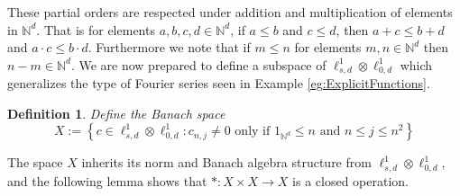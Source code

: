 \documentclass{article}
\newtheorem{definition}[theorem]{Definition}
\newcommand{\N}{\mathbb{N}}
\begin{document}
 These partial orders are respected under addition and multiplication of elements in $\N^d$. That is for elements $a,b,c,d \in \N^d$, if $ a \leq b$ and $c \leq d $, then $ a + c \leq b + d$ and $ a \cdot c \leq b \cdot d$. 
 Furthermore we note that if $ m \leq n $ for elements $ m,n \in \N^d$ then $ n - m \in \N^d$.   
 We are now prepared to define a subspace of  $\ell^1_{s,d} \otimes \ell^1_{0,d}$ which generalizes the type of Fourier series seen in Example \ref{eg:ExplicitFunctions}. 
\begin{definition}
	Define the Banach space 
	\[
	X := \left\{ 
	c \in \ell^1_{s,d} \otimes \ell^1_{0,d} :   c_{n,j} \neq  0 \mbox{ only if } 1_{\N^d} \leq n \mbox{ and } n \leq j \leq n^2
	\right\}
	\] 
	
	
\end{definition}
The space $X$ inherits its norm and Banach algebra structure from $ \ell^1_{s,d} \otimes \ell^1_{0,d}$, and the following lemma shows that  $*:X \times X \to X$ is a closed operation. 
 
\end{document}
